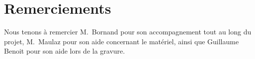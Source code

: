 \section{Remerciements}

Nous tenons à remercier M.\ Bornand pour son accompagnement tout au long du
projet, M.\ Maulaz pour son aide concernant le matériel, ainsi que Guillaume
Benoit pour son aide lors de la gravure.
